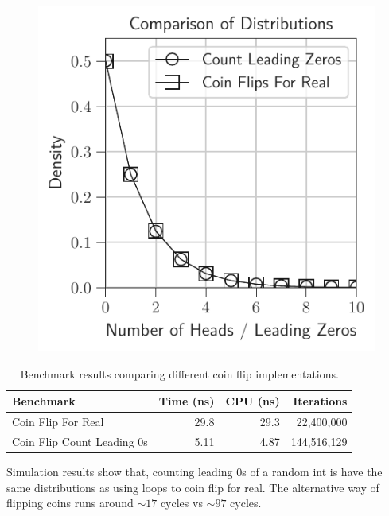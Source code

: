 \documentclass[12pt]{article}
\begin{document}
\begin{figure}[H]
\begin{minipage}{0.32\textwidth}
		\label{fig:coin_flips_count_leading}
	\end{minipage}\hfill
	\begin{minipage}{0.32\textwidth}
		\centering
		\includegraphics[width=\linewidth]{../notebook/plot/comparison_of_distributions.pdf}
		\label{fig:coin_flips_comparison}
	\end{minipage}
\end{figure}

\begin{table}[h]
	\centering
	\small
	\begin{tabular}{lrrr}
		\hline
		\textbf{Benchmark} & \textbf{Time (ns)} & \textbf{CPU (ns)} & \textbf{Iterations} \\
		\hline
		Coin Flip For Real & 29.8 & 29.3 & 22,400,000 \\
		\hline
		Coin Flip Count Leading 0s & 5.11 & 4.87 & 144,516,129 \\
	\end{tabular}
	\caption{Benchmark results comparing different coin flip implementations.}
	\label{tab:benchmark_results}
\end{table}

Simulation results show that, counting leading 0s of a random int is have the same distributions  as using loops to coin flip for real. The alternative way of flipping coins runs around $\sim17$ cycles vs $\sim 97$ cycles.\\
\end{document}
